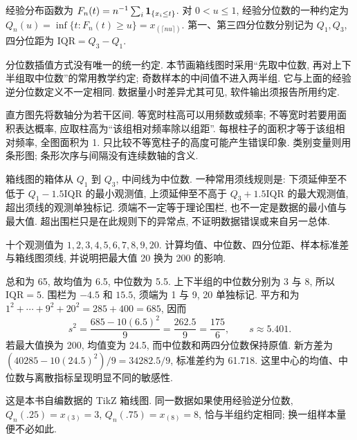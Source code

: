 \begin{definition}
经验分布函数为 $F_n(t)=n^{-1}\sum_i\mathbf 1_{\{x_i\le t\}}$. 对 $0<u\le1$, 经验分位数的一种约定为 $Q_n(u)=\inf\{t:F_n(t)\ge u\}=x_{(\lceil nu\rceil)}$. 第一、第三四分位数分别记为 $Q_1,Q_3$, 四分位距为 $\mathrm{IQR}=Q_3-Q_1$.
\end{definition}
分位数插值方式没有唯一的统一约定. 本节画箱线图时采用“先取中位数, 再对上下半组取中位数”的常用教学约定; 奇数样本的中间值不进入两半组. 它与上面的经验逆分位数定义不一定相同. 数据量小时差异尤其可见, 软件输出须报告所用约定.

直方图先将数轴分为若干区间. 等宽时柱高可以用频数或频率; 不等宽时若要用面积表达概率, 应取柱高为“该组相对频率除以组距”. 每根柱子的面积才等于该组相对频率, 全图面积为 1. 只比较不等宽柱子的高度可能产生错误印象. 类别变量则用条形图; 条形次序与间隔没有连续数轴的含义.

箱线图的箱体从 $Q_1$ 到 $Q_3$, 中间线为中位数. 一种常用须线规则是: 下须延伸至不低于 $Q_1-1.5\mathrm{IQR}$ 的最小观测值, 上须延伸至不高于 $Q_3+1.5\mathrm{IQR}$ 的最大观测值, 超出须线的观测单独标记. 须端不一定等于理论围栏, 也不一定是数据的最小值与最大值. 超出围栏只是在此规则下的异常点, 不证明数据错误或来自另一总体.

\begin{example}
十个观测值为 $1,2,3,4,5,6,7,8,9,20$. 计算均值、中位数、四分位距、样本标准差与箱线图须线, 并说明把最大值 20 换为 200 的影响.
\end{example}
\begin{solution}
总和为 65, 故均值为 6.5, 中位数为 5.5. 上下半组的中位数分别为 3 与 8, 所以 $\mathrm{IQR}=5$. 围栏为 $-4.5$ 和 $15.5$, 须端为 1 与 9, 20 单独标记. 平方和为 $1^2+\cdots+9^2+20^2=285+400=685$, 因而
\[
 s^2=\frac{685-10(6.5)^2}{9}=\frac{262.5}{9}=\frac{175}{6},\qquad s\approx5.401.
\]
若最大值换为 200, 均值变为 24.5, 而中位数和两四分位数保持原值. 新方差为 $(40285-10(24.5)^2)/9=34282.5/9$, 标准差约为 61.718. 这里中心的均值、中位数与离散指标呈现明显不同的敏感性.
\end{solution}
\begin{center}
\end{center}
这是本书自编数据的 TikZ 箱线图. 同一数据如果使用经验逆分位数, $Q_n(.25)=x_{(3)}=3$, $Q_n(.75)=x_{(8)}=8$, 恰与半组约定相同; 换一组样本量便不必如此.

